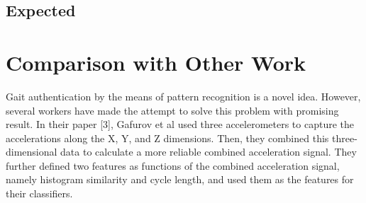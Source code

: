 \documentclass[10pt,twocolumn,letterpaper]{article}
\begin{document}
\subsection{Expected}

\section{Comparison with Other Work}
Gait authentication by the means of pattern recognition is a novel idea. However, several workers have made the attempt to solve this problem with promising result. In their paper [3], Gafurov et al used three accelerometers to capture the accelerations along the X, Y, and Z dimensions. Then, they combined this three-dimensional data to calculate a more reliable combined acceleration signal. They further defined two features as functions of the combined acceleration signal, namely histogram similarity and cycle length, and used them as the features for their classifiers.
\end{document}
